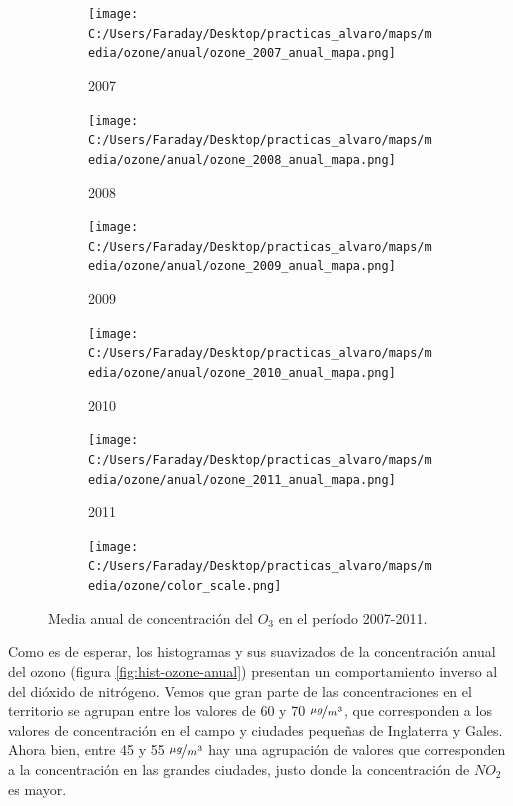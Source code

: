 \documentclass[12pt]{article}
\begin{document}
\begin{figure}[H]
\centering
\begin{subfigure}[H]{0.18\textwidth}
\texttt{[image: C:/Users/Faraday/Desktop/practicas\_alvaro/maps/media/ozone/anual/ozone\_2007\_anual\_mapa.png]}
\captionsetup{labelformat=empty}
\caption{2007}
\end{subfigure}
%
\begin{subfigure}[H]{0.18\textwidth}
\texttt{[image: C:/Users/Faraday/Desktop/practicas\_alvaro/maps/media/ozone/anual/ozone\_2008\_anual\_mapa.png]}
\captionsetup{labelformat=empty}
\caption{2008}
\end{subfigure}
%
\begin{subfigure}[H]{0.18\textwidth}
\texttt{[image: C:/Users/Faraday/Desktop/practicas\_alvaro/maps/media/ozone/anual/ozone\_2009\_anual\_mapa.png]}
\captionsetup{labelformat=empty}
\caption{2009}
\end{subfigure}
%
\begin{subfigure}[H]{0.18\textwidth}
\texttt{[image: C:/Users/Faraday/Desktop/practicas\_alvaro/maps/media/ozone/anual/ozone\_2010\_anual\_mapa.png]}
\captionsetup{labelformat=empty}
\caption{2010}
\end{subfigure}
%
\begin{subfigure}[H]{0.18\textwidth}
\texttt{[image: C:/Users/Faraday/Desktop/practicas\_alvaro/maps/media/ozone/anual/ozone\_2011\_anual\_mapa.png]}
\captionsetup{labelformat=empty}
\caption{2011}
\end{subfigure}

\begin{subfigure}[H]{0.45\textwidth}
\texttt{[image: C:/Users/Faraday/Desktop/practicas\_alvaro/maps/media/ozone/color\_scale.png]}
\captionsetup{labelformat=empty}
\caption{}
\end{subfigure}

\vspace*{-7mm}
\caption{Media anual de concentración del $O_{3}$ en el período 2007-2011.}
\label{fig:map-ozone-anual}
\end{figure}

Como es de esperar, los histogramas y sus suavizados de la concentración anual del ozono (figura \ref{fig:hist-ozone-anual}) presentan un comportamiento inverso al del dióxido de nitrógeno. Vemos que gran parte de las concentraciones en el territorio se agrupan entre los valores de 60 y 70 $\nicefrac{\mu g}{m^{3}}$, que corresponden a los valores de concentración en el campo y ciudades pequeñas de Inglaterra y Gales. Ahora bien, entre 45 y 55 $\nicefrac{\mu g}{m^{3}}$ hay una agrupación de valores que corresponden a la concentración en las grandes ciudades, justo donde la concentración de $NO_{2}$ es mayor.
\end{document}
